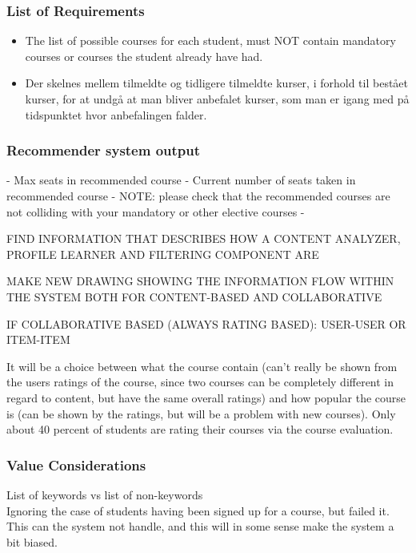 \subsubsection{List of Requirements}
\begin{itemize}
	\item The list of possible courses for each student, must NOT contain mandatory courses or courses the student already have had.
	\item Der skelnes mellem tilmeldte og tidligere tilmeldte kurser, i forhold til bestået kurser, for at undgå at man bliver anbefalet kurser, som man er igang med på tidspunktet hvor anbefalingen falder. 
\end{itemize}
  

\subsubsection{Recommender system output}

- Max seats in recommended course
- Current number of seats taken in recommended course
- NOTE: please check that the recommended courses are not colliding with your mandatory or other elective courses
- 




FIND INFORMATION THAT DESCRIBES HOW A CONTENT ANALYZER, PROFILE LEARNER AND FILTERING COMPONENT ARE 

MAKE NEW DRAWING SHOWING THE INFORMATION FLOW WITHIN THE SYSTEM BOTH FOR CONTENT-BASED AND COLLABORATIVE



IF COLLABORATIVE BASED (ALWAYS RATING BASED): USER-USER OR ITEM-ITEM

It will be a choice between what the course contain (can't really be shown from the users ratings of the course, since two courses can be completely different in regard to content, but have the same overall ratings) and how popular the course is (can be shown by the ratings, but will be a problem with new courses). Only about 40 percent of students are rating their courses via the course evaluation.

\subsubsection{Value Considerations} %
\label{sub:value_considerations}
List of keywords vs list of non-keywords\\
Ignoring the case of students having been signed up for a course, but failed it. This can the system not handle, and this will in some sense make the system a bit biased. 

